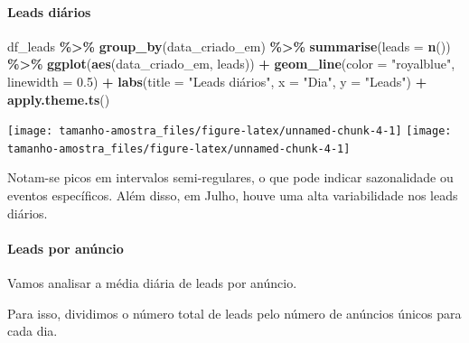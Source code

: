\documentclass[
]{article}
\newenvironment{Shaded}{\begin{snugshade}}{\end{snugshade}}
\newcommand{\AttributeTok}[1]{\textcolor[rgb]{0.13,0.29,0.53}{#1}}
\newcommand{\FloatTok}[1]{\textcolor[rgb]{0.00,0.00,0.81}{#1}}
\newcommand{\FunctionTok}[1]{\textcolor[rgb]{0.13,0.29,0.53}{\textbf{#1}}}
\newcommand{\NormalTok}[1]{#1}
\newcommand{\SpecialCharTok}[1]{\textcolor[rgb]{0.81,0.36,0.00}{\textbf{#1}}}
\newcommand{\StringTok}[1]{\textcolor[rgb]{0.31,0.60,0.02}{#1}}
\begin{document}
\paragraph{Leads diários}\label{leads-diuxe1rios}

\begin{Shaded}
\begin{Highlighting}[]
\NormalTok{df\_leads }\SpecialCharTok{\%\textgreater{}\%}
  \FunctionTok{group\_by}\NormalTok{(data\_criado\_em) }\SpecialCharTok{\%\textgreater{}\%}
  \FunctionTok{summarise}\NormalTok{(}\AttributeTok{leads =} \FunctionTok{n}\NormalTok{()) }\SpecialCharTok{\%\textgreater{}\%}
  \FunctionTok{ggplot}\NormalTok{(}\FunctionTok{aes}\NormalTok{(data\_criado\_em, leads)) }\SpecialCharTok{+}
  \FunctionTok{geom\_line}\NormalTok{(}\AttributeTok{color =} \StringTok{"royalblue"}\NormalTok{, }\AttributeTok{linewidth =} \FloatTok{0.5}\NormalTok{) }\SpecialCharTok{+}
  \FunctionTok{labs}\NormalTok{(}\AttributeTok{title =} \StringTok{"Leads diários"}\NormalTok{,}
       \AttributeTok{x =} \StringTok{"Dia"}\NormalTok{,}
       \AttributeTok{y =} \StringTok{"Leads"}\NormalTok{) }\SpecialCharTok{+}
  \FunctionTok{apply.theme.ts}\NormalTok{()}
\end{Highlighting}
\end{Shaded}

\begin{center}  { \texttt{[image: tamanho-amostra\_files/figure-latex/unnamed-chunk-4-1]} } { \texttt{[image: tamanho-amostra\_files/figure-latex/unnamed-chunk-4-1]} }  \end{center}

Notam-se picos em intervalos semi-regulares, o que pode indicar
sazonalidade ou eventos específicos. Além disso, em Julho, houve uma
alta variabilidade nos leads diários.

\paragraph{Leads por anúncio}\label{leads-por-anuxfancio}

Vamos analisar a média diária de leads por anúncio.

Para isso, dividimos o número total de leads pelo número de anúncios
únicos para cada dia.
\end{document}
